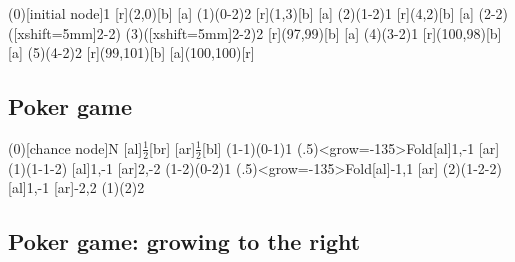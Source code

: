 \begin{tcblisting}{}
\begin{istgame}[scale=1.5]
\xtdistance{10mm}{20mm}
\istroot(0)[initial node]{1}
  [r]{(2,0)}[b]  [a]  \endist
\istroot(1)(0-2){2}
  [r]{(1,3)}[b]  [a]  \endist
\istroot(2)(1-2){1}
  [r]{(4,2)}[b]  [a]  \endist
\xtInfoset(2-2)([xshift=5mm]2-2)
\istroot(3)([xshift=5mm]2-2){2}
  [r]{(97,99)}[b]  [a]  \endist
\istroot(4)(3-2){1}
  [r]{(100,98)}[b]  [a]  \endist
\istroot(5)(4-2){2}
  [r]{(99,101)}[b]  [a]{(100,100)}[r]  \endist
\end{istgame}
\end{tcblisting}


\subsection{Poker game}

\begin{tcblisting}{}
\begin{istgame}[scale=1.7]
\xtShowEndPoints
\xtdistance{15mm}{30mm}
\istroot(0)[chance node]{N}
  [al]{$\frac12$}[br]
  [ar]{$\frac12$}[bl]
  \endist
\xtdistance{15mm}{30mm}
\istroot(1-1)(0-1){1}
  \istbA(.5)<grow=-135>{Fold}[al]{1,-1}
  [ar]
  \endist
\xtdistance{10mm}{20mm}
\istroot(1)(1-1-2)
  [al]{1,-1}
  [ar]{2,-2}
  \endist
\xtdistance{15mm}{30mm}
\istroot(1-2)(0-2){1}
  \istbA(.5)<grow=-135>{Fold}[al]{-1,1}
  [ar]
  \endist
\xtdistance{10mm}{20mm}
\istroot(2)(1-2-2){}
  [al]{1,-1}
  [ar]{-2,2}
  \endist
\xtInfoset(1)(2){2}
\end{istgame}
\end{tcblisting}


\subsection{Poker game: growing to the right}
\label{p:poker-right}

